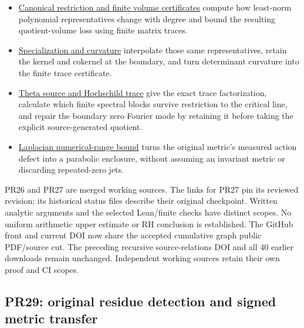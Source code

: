 \documentclass[
]{article}
\providecommand{\tightlist}{%
  \setlength{\itemsep}{0pt}\setlength{\parskip}{0pt}}
\begin{document}
\begin{itemize}
\tightlist
\item
  \href{workbenches/tau-restriction-certificate-formal/RESEARCH_NOTE.md}{Canonical
  restriction and finite volume certificates} compute how least-norm
  polynomial representatives change with degree and bound the resulting
  quotient-volume loss using finite matrix traces.
\item
  \href{https://github.com/KokunoYumeto/zeta-function-research-reader/blob/a4a87844c257485ae6d669f5b3eb6d96b9e8b8d8/workbenches/tau-specialization-curvature-formal/RESEARCH_NOTE.md}{Specialization
  and curvature} interpolate those same representatives, retain the
  kernel and cokernel at the boundary, and turn determinant curvature
  into the finite trace certificate.
\item
  \href{https://github.com/KokunoYumeto/zeta-function-research-reader/blob/a4a87844c257485ae6d669f5b3eb6d96b9e8b8d8/workbenches/tau-specialization-curvature-formal/HOCHSCHILD_COMPARISON.md}{Theta
  source and Hochschild trace} give the exact trace factorization,
  calculate which finite spectral blocks survive restriction to the
  critical line, and repair the boundary zero Fourier mode by retaining
  it before taking the explicit source-generated quotient.
\item
  \href{https://github.com/KokunoYumeto/zeta-function-research-reader/blob/a4a87844c257485ae6d669f5b3eb6d96b9e8b8d8/workbenches/tau-specialization-curvature-formal/LAPLACIAN_PARABOLA.md}{Laplacian
  numerical-range bound} turns the original metric's measured action
  defect into a parabolic enclosure, without assuming an invariant
  metric or discarding repeated-zero jets.
\end{itemize}

PR26 and PR27 are merged working sources. The links for PR27 pin its
reviewed revision; its historical status files describe their original
checkpoint. Written analytic arguments and the selected Lean/finite
checks have distinct scopes. No uniform arithmetic upper estimate or RH
conclusion is established. The GitHub front and current DOI now share
the accepted cumulative graph public PDF/source cut. The preceding
recursive source-relations DOI and all 40 earlier downloads remain
unchanged. Independent working sources retain their own proof and CI
scopes.

\subsection{PR29: original residue detection and signed metric
transfer}\label{pr29-original-residue-detection-and-signed-metric-transfer}
\end{document}
